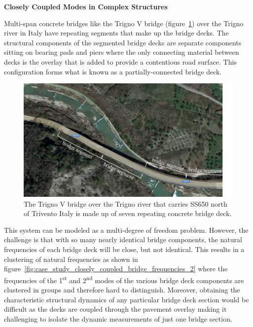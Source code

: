\documentclass[12pt,letter]{article}
\begin{document}
	\begin{vibration_case_study}

	\textbf{Closely Coupled Modes in Complex Structures}

	\noindent Multi-span concrete bridges like the Trigno V bridge (figure~\ref{fig:case_study_closely_coupled_bridge_frequencies_1}) over the Trigno river in Italy have repeating segments that make up the bridge decks. The structural components of the segmented bridge decks are separate components sitting on bearing pads and piers where the only connecting material between decks is the overlay that is added to provide a contentious road surface. This configuration forms what is known as a partially-connected bridge deck\protect\footnotemark[1].
	\begin{figure}[H]
		\centering
		\includegraphics[width=\linewidth]{../figures/case_study_closely_coupled_bridge_frequencies_1}
		\caption{The Trigno V bridge over the Trigno river that carries SS650 north of Trivento Italy is made up of seven repeating concrete bridge deck\protect\footnotemark[2]. }%
		\label{fig:case_study_closely_coupled_bridge_frequencies_1}
	\end{figure}
	
	This system can be modeled as a multi-degree of freedom problem. However, the challenge is that with so many nearly identical bridge components, the natural frequencies of each bridge deck will be close, but not identical. This results in a clustering of natural frequencies as shown in figure~\ref{fig:case_study_closely_coupled_bridge_frequencies_2} where the frequencies of the 1\textsuperscript{st} and 2\textsuperscript{nd} modes of the various bridge deck components are clustered in groups and therefore hard to distinguish. Moreover, obtaining the characteristic structural dynamics of any particular bridge deck section would be difficult as the decks are coupled through the pavement overlay making it challenging to isolate the dynamic measurements of just one bridge section. 
	

\end{vibration_case_study}
\end{document}
